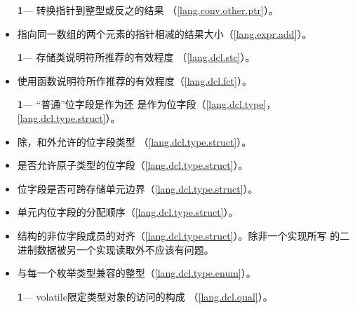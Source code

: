 \begin{itemize}
  \item[\textbf{1}\hspace{5pt}---]{转换指针到整型或反之的结果
    （\ref{lang.conv.other.ptr}）。}
  \item{指向同一数组的两个元素的指针相减的结果大小（\ref{lang.expr.add}）。}
\end{itemize}

\begin{itemize}
  \item[\textbf{1}\hspace{5pt}---]{存储类说明符所推荐的有效程度
    （\ref{lang.dcl.stc}）。}
  \item{使用函数说明符所作推荐的有效程度（\ref{lang.dcl.fct}）。}
\end{itemize}

\begin{itemize} %
  \item[\textbf{1}\hspace{5pt}---]{``普通''位字段是作为还
    是作为位字段（\ref{lang.dcl.type}，
    \ref{lang.dcl.type.struct}）。}
  \item{除，和外允许的位字段类型
    （\ref{lang.dcl.type.struct}）。}
  \item{是否允许原子类型的位字段（\ref{lang.dcl.type.struct}）。}
  \item{位字段是否可跨存储单元边界（\ref{lang.dcl.type.struct}）。}
  \item{单元内位字段的分配顺序（\ref{lang.dcl.type.struct}）。}
  \item{结构的非位字段成员的对齐（\ref{lang.dcl.type.struct}）。除非一个实现所写
    的二进制数据被另一个实现读取外不应该有问题。}
  \item{与每一个枚举类型兼容的整型（\ref{lang.dcl.type.enum}）。}
\end{itemize}

\begin{itemize}
  \item[\textbf{1}\hspace{5pt}---]{volatile限定类型对象的访问的构成
    （\ref{lang.dcl.qual}）。}
\end{itemize}

